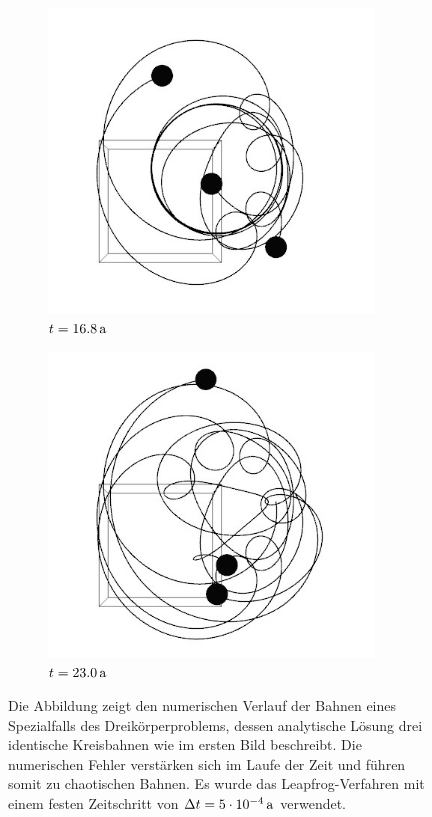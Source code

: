 \begin{figure}[h]
      \begin{subfigure}[b]{0.49\textwidth}
        \center
        \includegraphics[width=0.95\textwidth]{pictures/three_body/triangle_5.jpg}
        \caption{$t=16.8\,\mathrm{a}$}
      \end{subfigure}
      \begin{subfigure}[b]{0.49\textwidth}
        \center
        \includegraphics[width=0.95\textwidth]{pictures/three_body/triangle_6.jpg}
        \caption{$t=23.0\,\mathrm{a}$}
      \end{subfigure}
      \caption{Die Abbildung zeigt den numerischen Verlauf der Bahnen eines Spezialfalls des Dreikörperproblems, dessen analytische Lösung drei identische Kreisbahnen wie im ersten Bild beschreibt. Die numerischen Fehler verstärken sich im Laufe der Zeit und führen somit zu chaotischen Bahnen. Es wurde das Leapfrog-Verfahren mit einem festen Zeitschritt von $\Delta t = 5\cdot 10^{-4}\,\mathrm{a}$ verwendet.}
      \label{fig:dkp}
    \end{figure}


